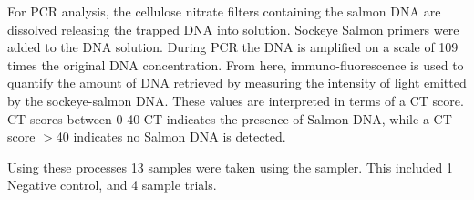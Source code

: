 \documentclass[11pt, letterpaper]{article}
\begin{document}
\newline\par
For PCR analysis, the cellulose nitrate filters containing the salmon DNA are dissolved releasing the trapped DNA into solution. Sockeye Salmon primers were added to the DNA solution. During PCR the DNA is amplified on a scale of 109 times the original DNA concentration.  From here, immuno-fluorescence is used to quantify the amount of DNA retrieved by measuring the intensity of light emitted by the sockeye-salmon DNA. These values are interpreted in terms of a CT score. CT scores between 0-40 CT indicates the presence of Salmon DNA, while a CT score $>$40 indicates no Salmon DNA is detected.
\newline\par
Using these processes 13 samples were taken using the sampler. This included 1 Negative control, and 4 sample trials.
\end{document}
